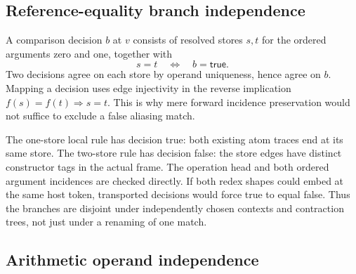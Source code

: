 



\subsection{Reference-equality branch independence}

A comparison decision $b$ at $v$ consists of resolved stores $s,t$ for the
ordered arguments zero and one, together with
\[
       s=t\quad\Longleftrightarrow\quad b=\mathsf{true}.
\]
Two decisions agree on each store by operand uniqueness, hence agree on $b$.
Mapping a decision uses edge injectivity in the reverse implication
$f(s)=f(t)\Rightarrow s=t$. This is why mere forward incidence preservation
would not suffice to exclude a false aliasing match.




The one-store local rule has decision true: both existing atom traces end
at its same store. The two-store rule has decision false: the store edges
have distinct constructor tags in the actual frame. The operation head and
both ordered argument incidences are checked directly. If both redex shapes
could embed at the same host token, transported decisions would force true
to equal false. Thus the branches are disjoint under independently chosen
contexts and contraction trees, not just under a renaming of one match.




\subsection{Arithmetic operand independence}

